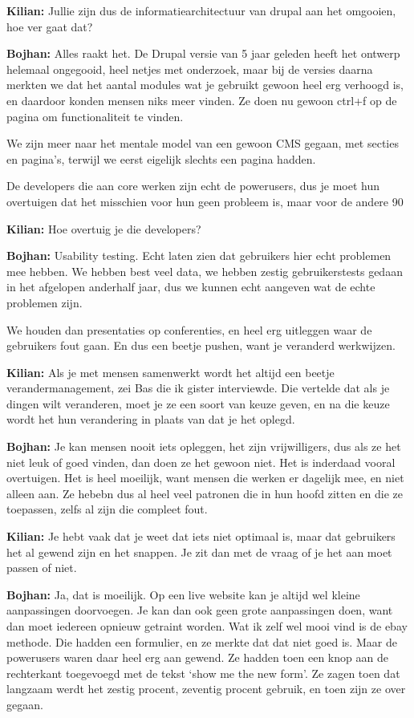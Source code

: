 \textbf{Kilian:} Jullie zijn dus de informatiearchitectuur van drupal aan het omgooien, hoe ver gaat dat?

\textbf{Bojhan:} Alles raakt het. De Drupal versie van 5 jaar geleden heeft het ontwerp helemaal ongegooid, heel netjes met onderzoek, maar bij de versies daarna merkten we dat het aantal modules wat je gebruikt gewoon heel erg verhoogd is, en daardoor konden mensen niks meer vinden. Ze doen nu gewoon ctrl+f op de pagina om functionaliteit te vinden.

We zijn meer naar het mentale model van een gewoon CMS gegaan, met secties en pagina's, terwijl we eerst eigelijk slechts een pagina hadden.

De developers die aan core werken zijn echt de powerusers, dus je moet hun overtuigen dat het misschien voor hun geen probleem is, maar voor de andere 90%

\textbf{Kilian:} Hoe overtuig je die developers?

\textbf{Bojhan:} Usability testing. Echt laten zien dat gebruikers hier echt problemen mee hebben. We hebben best veel data, we hebben zestig gebruikerstests gedaan in het afgelopen anderhalf jaar, dus we kunnen echt aangeven wat de echte problemen zijn.

We houden dan presentaties op conferenties, en heel erg uitleggen waar de gebruikers fout gaan. En dus een beetje pushen, want je veranderd werkwijzen.

\textbf{Kilian:} Als je met mensen samenwerkt wordt het altijd een beetje verandermanagement, zei Bas die ik gister interviewde. Die vertelde dat als je dingen wilt veranderen, moet je ze een soort van keuze geven, en na die keuze wordt het hun verandering in plaats van dat je het oplegd.

\textbf{Bojhan:} Je kan mensen nooit iets opleggen, het zijn vrijwilligers, dus als ze het niet leuk of goed vinden, dan doen ze het gewoon niet. Het is inderdaad vooral overtuigen. Het is heel moeilijk, want mensen die werken er dagelijk mee, en niet alleen aan. Ze hebebn dus al heel veel patronen die in hun hoofd zitten en die ze toepassen, zelfs al zijn die compleet fout.

\textbf{Kilian:} Je hebt vaak dat je weet dat iets niet optimaal is, maar dat gebruikers het al gewend zijn en het snappen. Je zit dan met de vraag of je het aan moet passen of niet.

\textbf{Bojhan:} Ja, dat is moeilijk. Op een live website kan je altijd wel kleine aanpassingen doorvoegen. Je kan dan ook geen grote aanpassingen doen, want dan moet iedereen opnieuw getraint worden. Wat ik zelf wel mooi vind is de ebay methode. Die hadden een formulier, en ze merkte dat dat niet goed is. Maar de powerusers waren daar heel erg aan gewend. Ze hadden toen een knop aan de rechterkant toegevoegd met de tekst `show me the new form'. Ze zagen toen dat langzaam werdt het zestig procent, zeventig procent gebruik, en toen zijn ze over gegaan.

